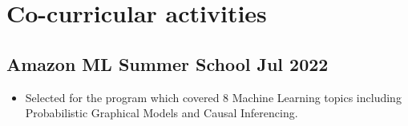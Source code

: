 \documentclass[10pt]{article}
\newenvironment{zitemize}{
\begin{itemize}\itemsep2pt \parskip0pt \parsep1pt}
{\end{itemize}\vspace{-0.7cm}}
\begin{document}






\section{Co-curricular activities }

\subsection*{Amazon ML Summer School \hfill Jul 2022} 
    \begin{zitemize}
            \item Selected for the program which covered 8 Machine Learning topics including Probabilistic Graphical Models \newline and Causal Inferencing.
    \end{zitemize}
\end{document}
